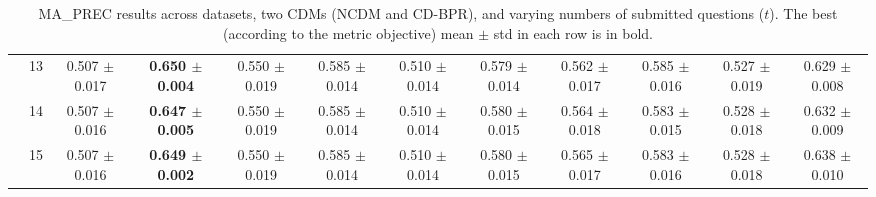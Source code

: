 \begin{table*}[t]
{\begin{tabular}{%
  ll
  @{\quad}
  c@{\hskip 4pt}c
  @{\quad\quad}
  c@{\hskip 4pt}c
  @{\quad\quad}
  c@{\hskip 4pt}c
  @{\quad\quad}
  c@{\hskip 4pt}c
  @{\quad\quad}
  c@{\hskip 4pt}c
}
        & 13 & 0.507 $\pm$ 0.017 & \textbf{0.650 $\pm$ 0.004} & 0.550 $\pm$ 0.019 & 0.585 $\pm$ 0.014 & 0.510 $\pm$ 0.014 & 0.579 $\pm$ 0.014 & 0.562 $\pm$ 0.017 & 0.585 $\pm$ 0.016 & 0.527 $\pm$ 0.019 & 0.629 $\pm$ 0.008 \\
        & 14 & 0.507 $\pm$ 0.016 & \textbf{0.647 $\pm$ 0.005} & 0.550 $\pm$ 0.019 & 0.585 $\pm$ 0.014 & 0.510 $\pm$ 0.014 & 0.580 $\pm$ 0.015 & 0.564 $\pm$ 0.018 & 0.583 $\pm$ 0.015 & 0.528 $\pm$ 0.018 & 0.632 $\pm$ 0.009 \\
        & 15 & 0.507 $\pm$ 0.016 & \textbf{0.649 $\pm$ 0.002} & 0.550 $\pm$ 0.019 & 0.585 $\pm$ 0.014 & 0.510 $\pm$ 0.014 & 0.580 $\pm$ 0.015 & 0.565 $\pm$ 0.017 & 0.583 $\pm$ 0.016 & 0.528 $\pm$ 0.018 & 0.638 $\pm$ 0.010 \\
\bottomrule
\end{tabular}
}
\caption{MA_PREC results across datasets, two CDMs (NCDM and CD-BPR), and varying numbers of submitted questions ($t$). The best (according to the metric objective) mean $\pm$ std in each row is in bold.}
\label{tab:results-ma_prec}
\end{table*}


